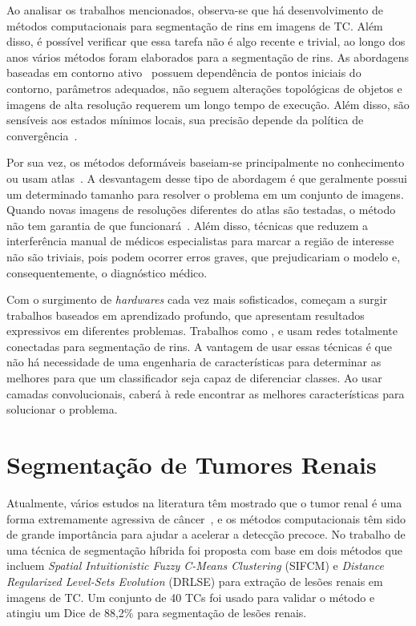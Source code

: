 Ao analisar os trabalhos mencionados, observa-se que há desenvolvimento de métodos computacionais para segmentação de rins em imagens de TC. Além disso, é possível verificar que essa tarefa não é algo recente e trivial, ao longo dos anos vários métodos foram elaborados para a segmentação de rins. As abordagens baseadas em contorno ativo~\cite{skalski2017kidney} possuem dependência de pontos iniciais do contorno, parâmetros adequados, não seguem alterações topológicas de objetos e imagens de alta resolução requerem um longo tempo de execução. Além disso, são sensíveis aos estados mínimos locais, sua precisão depende da política de convergência~\cite{bakovs2007active}.

Por sua vez, os métodos deformáveis baseiam-se principalmente no conhecimento ou usam atlas~\cite{wolz2013automated,yang2014automatic,yang2018automatic}. A desvantagem desse tipo de abordagem é que geralmente possui um determinado tamanho para resolver o problema em um conjunto de imagens. Quando novas imagens de resoluções diferentes do atlas são testadas, o método não tem garantia de que funcionará~\cite{SOUZA2019285}. Além disso, técnicas que reduzem a interferência manual de médicos especialistas \cite{mehta2019segmenting} para marcar a região de interesse não são triviais, pois podem ocorrer erros graves, que prejudicariam o modelo e, consequentemente, o diagnóstico médico.

Com o surgimento de \textit{hardwares} cada vez mais sofisticados, começam a surgir trabalhos baseados em aprendizado profundo, que apresentam resultados expressivos em diferentes problemas. Trabalhos como ,  e  usam redes totalmente conectadas para segmentação de rins. A vantagem de usar essas técnicas é que não há necessidade de uma engenharia de características para determinar as melhores para que um classificador seja capaz de diferenciar classes. Ao usar camadas convolucionais, caberá à rede encontrar as melhores características para solucionar o problema.

\section{Segmentação de Tumores Renais}
\label{sec:trabalhos-relacionados-tumores-renais}

Atualmente, vários estudos na literatura têm mostrado que o tumor renal é uma forma extremamente agressiva de câncer~\cite{muglia2015renal, dreisin2016treating, warren2018isup}, e os métodos computacionais têm sido de grande importância para ajudar a acelerar a detecção precoce. No trabalho de  uma técnica de segmentação híbrida foi proposta com base em dois métodos que incluem \textit{Spatial Intuitionistic Fuzzy C-Means Clustering} (SIFCM) e \textit{Distance Regularized Level-Sets Evolution} (DRLSE) para extração de lesões renais em imagens de TC. Um conjunto de 40 TCs foi usado para validar o método e atingiu um Dice de 88,2\% para segmentação de lesões renais.

